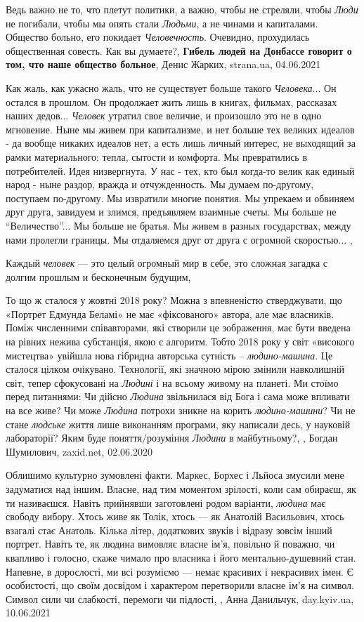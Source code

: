 Ведь важно не то, что плетут политики, а важно, чтобы не стреляли, чтобы \emph{Люди}
не погибали, чтобы мы опять стали \emph{Людьми}, а не чинами и капиталами. Общество
больно, его покидает \emph{Человечность}. Очевидно, прохудилась общественная совесть.
Как вы думаете?,
\textbf{Гибель людей на Донбассе говорит о том, что наше общество больное},
Денис Жарких, strana.ua, 04.06.2021

Как жаль, как ужасно жаль, что не существует больше такого \emph{Человека}... Он
остался в прошлом. Он продолжает жить лишь в книгах, фильмах, рассказах наших
дедов...  \emph{Человек} утратил свое величие, и произошло это не в одно мгновение.
Ныне мы живем при капитализме, и нет больше тех великих идеалов - да вообще
никаких идеалов нет, а есть лишь личный интерес, не выходящий за рамки
материального: тепла, сытости и комфорта. Мы превратились в потребителей. Идея
низвергнута. У нас - тех, кто был когда-то велик как единый народ - ныне
раздор, вражда и отчужденность. Мы думаем по-другому, поступаем по-другому. Мы
извратили многие понятия. Мы упрекаем и обвиняем друг друга, завидуем и злимся,
предъявляем взаимные счеты. Мы больше не \enquote{Величество}...  Мы больше не братья.
Мы живем в разных государствах, между нами пролегли границы. Мы отдаляемся друг
от друга с огромной скоростью... ,

Каждый \emph{человек} — это целый огромный мир в себе, это сложная загадка с долгим
прошлым и бесконечным будущим, 

То що ж сталося у жовтні 2018 року? Можна з впевненістю стверджувати, що
«Портрет Едмунда Беламі» не має «фіксованого» автора, але має власників. Поміж
численними співавторами, які створили це зображення, має бути введена на рівних
нежива субстанція, якою є алгоритм. Тобто 2018 року у світ «високого мистецтва»
увійшла нова гібридна авторська сутність – \emph{людино-машина}. Це сталося
цілком очікувано. Технології, які значною мірою змінили навколишній світ, тепер
сфокусовані на \emph{Людині} і на всьому живому на планеті. Ми стоїмо перед
питаннями: Чи дійсно \emph{Людина} звільнилася від Бога і сама може впливати на
все живе? Чи може \emph{Людина} потрохи зникне на корить \emph{людино-машини}?
Чи не стане \emph{людське} життя лише виконанням програми, яку написали десь, у
науковій лабораторії? Яким буде поняття/розуміння \emph{Людини} в майбутньому?,
, Богдан Шумилович, zaxid.net, 02.06.2020

Облишимо культурно зумовлені факти. Маркес, Борхес і Льйоса змусили мене
задуматися над іншим. Власне, над тим моментом зрілості, коли сам обираєш, як
ти називаєшся. Навіть прийнявши заготовлені родом варіанти, \emph{людина} має свободу
вибору. Хтось живе як Толік, хтось — як Анатолій Васильович, хтось взагалі стає
Анатоль. Кілька літер, додаткових звуків і відразу зовсім інший портрет. Навіть
те, як людина вимовляє власне ім'я, повільно й поважно, чи квапливо і голосно,
скаже чимало про власника і його ментально-душевний стан.  Напевне, в
дорослості, ми всі розуміємо — немає красивих і некрасивих імен. Є особистості,
що своїм досвідом і характером перетворили власне ім’я на символ. Символ сили
чи слабкості, перемоги чи підлості,
, Анна Данильчук, day.kyiv.ua, 10.06.2021

